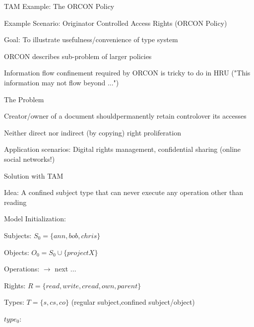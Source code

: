 \documentclass[a4paper]{article}
\begin{document}
\begin{multicols}{3}
    TAM Example: The ORCON Policy
    \begin{itemize*}
        \item Example Scenario: Originator Controlled Access Rights (ORCON Policy)
        \item Goal: To illustrate usefulness/convenience of type system
              \begin{itemize*}
                  \item ORCON describes sub-problem of larger policies
                  \item Information flow confinement required by ORCON is tricky to do in HRU ("This information may not flow beyond ...")
              \end{itemize*}
        \item The Problem
              \begin{itemize*}
                  \item Creator/owner of a document shouldpermanently retain controlover its accesses
                  \item Neither direct nor indirect (by copying) right proliferation
                  \item Application scenarios: Digital rights management, confidential sharing (online social networks!)
                  \item %
              \end{itemize*}
        \item Solution with TAM
              \begin{itemize*}
                  \item Idea: A confined subject type that can never execute any operation other than reading
                  \item Model Initialization:
                        \begin{itemize*}
                            \item Subjects: $S_0=\{ann,bob,chris\}$
                            \item Objects: $O_0 =S_0\cup\{projectX\}$
                            \item Operations: $\rightarrow$ next ...
                            \item Rights: $R=\{read,write,cread,own,parent\}$
                            \item Types: $T=\{s,cs,co\}$ (regular subject,confined subject/object)
                            \item $type_0$:

\end{itemize*}
\end{itemize*}
\end{itemize*}
\end{multicols}
\end{document}
